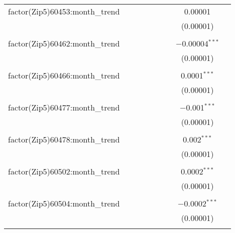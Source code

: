 \begin{table}[H]
{\begin{tabular}{@{\extracolsep{5pt}}lcccccccc}
  factor(Zip5)60453:month\_trend &  &  &  &  &  &  & 0.00001 &  \\  

   &  &  &  &  &  &  & (0.00001) &  \\  

   & & & & & & & & \\  

  factor(Zip5)60462:month\_trend &  &  &  &  &  &  & $-$0.00004$^{***}$ &  \\  

   &  &  &  &  &  &  & (0.00001) &  \\  

   & & & & & & & & \\  

  factor(Zip5)60466:month\_trend &  &  &  &  &  &  & 0.0001$^{***}$ &  \\  

   &  &  &  &  &  &  & (0.00001) &  \\  

   & & & & & & & & \\  

  factor(Zip5)60477:month\_trend &  &  &  &  &  &  & $-$0.001$^{***}$ &  \\  

   &  &  &  &  &  &  & (0.00001) &  \\  

   & & & & & & & & \\  

  factor(Zip5)60478:month\_trend &  &  &  &  &  &  & 0.002$^{***}$ &  \\  

   &  &  &  &  &  &  & (0.00001) &  \\  

   & & & & & & & & \\  

  factor(Zip5)60502:month\_trend &  &  &  &  &  &  & 0.0002$^{***}$ &  \\  

   &  &  &  &  &  &  & (0.00001) &  \\  

   & & & & & & & & \\  

  factor(Zip5)60504:month\_trend &  &  &  &  &  &  & $-$0.0002$^{***}$ &  \\  

   &  &  &  &  &  &  & (0.00001) &  \\  

   & & & & & & & & \\  


\end{tabular}}
\end{table}
